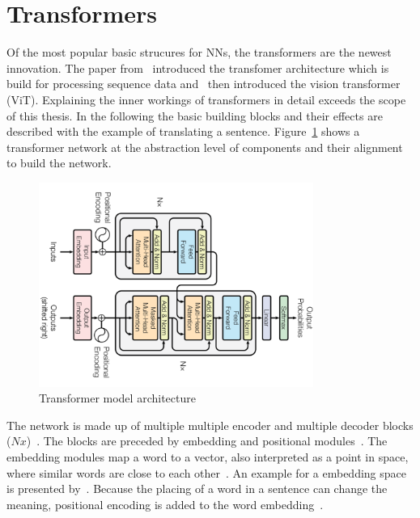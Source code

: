 \section{Transformers}
Of the most popular basic strucures for \acp{NN}, the transformers are the newest innovation.
The paper from~\cite{vaswani_attention_2017} introduced the transfomer architecture which is
build for processing sequence data and~\cite{dosovitskiy_image_2021} then introduced the vision
transformer (ViT).
Explaining the inner workings of transformers in detail exceeds the scope of this thesis.
In the following the basic building blocks and their effects are described with the example of
translating a sentence.
Figure~\ref{fig:transformer} shows a transformer network at the abstraction level of components and
their alignment to build the network.
\begin{figure}[ht]
    \centering
    \includegraphics[width=0.8\textwidth]{img/Transformer-Vaswani-Attention-2017.png}
    \caption[Transformer architecture]{%
        Transformer model architecture~\citep{vaswani_attention_2017}\label{fig:transformer}
    }
\end{figure}
The network is made up of multiple multiple encoder and multiple decoder
blocks ($Nx$)~\citep{vaswani_attention_2017}.
The blocks are preceded by embedding and positional modules~\citep{vaswani_attention_2017}.
The embedding modules map a word to a vector, also interpreted as a point in space, where similar
words are close to each other~\citep{vaswani_attention_2017}.
An example for a embedding space is presented by~\cite{pennington_glove_2014}.
Because the placing of a word in a sentence can change the meaning, positional
encoding is added to the word embedding~\citep{vaswani_attention_2017}.
